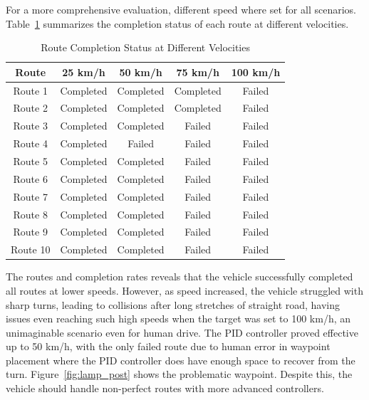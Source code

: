 \documentclass[conference]{IEEEtran}
\begin{document}
For a more comprehensive evaluation, different speed where set for all scenarios. Table~\ref{tab:completion_status} summarizes the completion status of each route at different velocities.

\begin{table}[H]
    \centering
    \caption{Route Completion Status at Different Velocities}
    \begin{tabular}{|c|c|c|c|c|}
        \hline
        \textbf{Route} & \textbf{25 km/h} & \textbf{50 km/h} & \textbf{75 km/h} & \textbf{100 km/h} \\
        \hline
        Route 1 & Completed & Completed & Completed & Failed \\
        \hline
        Route 2 & Completed & Completed & Completed & Failed \\
        \hline
        Route 3 & Completed & Completed & Failed & Failed \\
        \hline
        Route 4 & Completed & Failed & Failed & Failed \\
        \hline
        Route 5 & Completed & Completed & Failed & Failed \\
        \hline
        Route 6 & Completed & Completed & Failed & Failed \\
        \hline
        Route 7 & Completed & Completed & Failed & Failed \\
        \hline
        Route 8 & Completed & Completed & Failed & Failed \\
        \hline
        Route 9 & Completed & Completed & Failed & Failed \\
        \hline
        Route 10 & Completed & Completed & Failed & Failed \\
        \hline
    \end{tabular}
    \label{tab:completion_status}
\end{table}

The routes and completion rates reveals that the vehicle successfully completed all routes at lower speeds. However, as speed increased, the vehicle struggled with sharp turns, leading to collisions after long stretches of straight road, having issues even reaching such high speeds when the target was set to 100 km/h, an unimaginable scenario even for human drive. The PID controller proved effective up to 50 km/h, with the only failed route due to human error in waypoint placement where the PID controller does have enough space to recover from the turn. Figure~\ref{fig:lamp_post} shows the problematic waypoint. Despite this, the vehicle should handle non-perfect routes with more advanced controllers.
\end{document}
